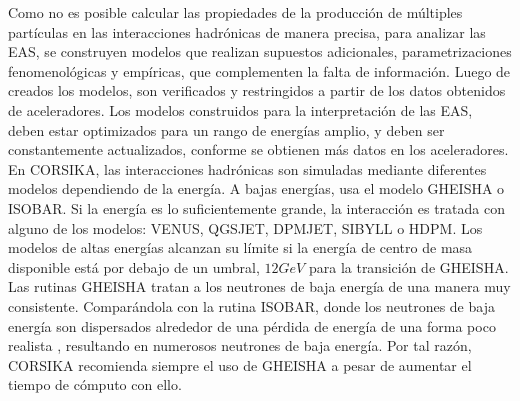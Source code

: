 Como no es posible calcular las  propiedades de la producción de múltiples partículas en las interacciones hadrónicas de manera precisa, para analizar las EAS, se construyen modelos que realizan supuestos adicionales, parametrizaciones fenomenológicas y empíricas, que complementen la falta de información. Luego de creados los modelos, son verificados y restringidos a partir de los datos obtenidos de aceleradores. Los modelos construidos para la interpretación de las EAS, deben estar optimizados para un rango de energías amplio, y deben ser constantemente actualizados, conforme se obtienen más datos en los aceleradores.\\

En CORSIKA, las interacciones hadrónicas son simuladas mediante diferentes modelos dependiendo de la energía. A bajas energías, usa el modelo GHEISHA o ISOBAR. Si la energía es lo suficientemente grande, la interacción es tratada con alguno de los modelos: VENUS, QGSJET, DPMJET, SIBYLL o HDPM. Los modelos de altas energías  alcanzan su límite si la energía de centro de masa disponible está por debajo de  un umbral, $12 GeV$ para la transición de GHEISHA. \\

Las rutinas GHEISHA tratan a los neutrones de baja energía de una manera muy consistente. Comparándola con la rutina ISOBAR, donde los neutrones de baja energía son dispersados alrededor de una pérdida de energía de una forma poco realista \citep{Allen}, resultando en numerosos neutrones de baja energía. Por tal razón, CORSIKA recomienda siempre el uso de GHEISHA a pesar de aumentar el tiempo de cómputo con ello.\\

